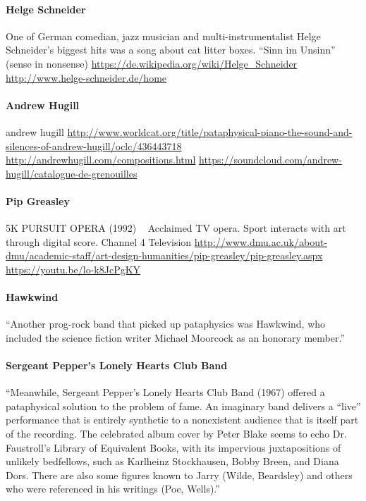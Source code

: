 \paragraph{Helge Schneider}
One of German comedian, jazz musician and multi-instrumentalist Helge Schneider's biggest hits was a song about cat litter boxes. 
``Sinn im Unsinn'' (sense in nonsense) \autocite{}
\url{https://de.wikipedia.org/wiki/Helge_Schneider}
\url{http://www.helge-schneider.de/home}

\paragraph{Andrew Hugill}
andrew hugill
\url{http://www.worldcat.org/title/pataphysical-piano-the-sound-and-silences-of-andrew-hugill/oclc/436443718}
\url{http://andrewhugill.com/compositions.html}
\url{https://soundcloud.com/andrew-hugill/catalogue-de-grenouilles}

\paragraph{Pip Greasley}
5K PURSUIT OPERA (1992)  
Acclaimed TV opera. Sport interacts with art through digital score. Channel 4 Television
\url{http://www.dmu.ac.uk/about-dmu/academic-staff/art-design-humanities/pip-greasley/pip-greasley.aspx}
\url{https://youtu.be/lo-k8JcPgKY}


\paragraph{Hawkwind}
``Another prog-rock band that picked up pataphysics was Hawkwind, who included the science fiction writer Michael Moorcock as an honorary member.''\autocite*{Hugill2012}

\paragraph{Sergeant Pepper’s Lonely Hearts Club Band}
``Meanwhile, Sergeant Pepper’s Lonely Hearts Club Band (1967) offered a pataphysical solution to the problem of fame. An imaginary band delivers a “live” performance that is entirely synthetic to a nonexistent audience that is itself part of the recording. The celebrated album cover by Peter Blake seems to echo Dr. Faustroll’s Library of Equivalent Books, with its impervious juxtapositions of unlikely bedfellows, such as Karlheinz Stockhausen, Bobby Breen, and Diana Dors. There are also some figures known to Jarry (Wilde, Beardsley) and others who were referenced in his writings (Poe, Wells).''
\autocite*{Hugill2012}



